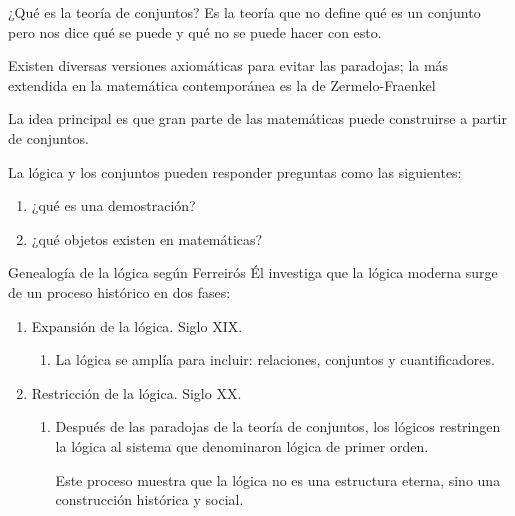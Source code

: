 \documentclass{beamer}
\begin{document}
\begin{frame}{¿Qué es la teoría de conjuntos?}
    Es la teoría que no define qué es un conjunto pero nos dice qué se puede y qué no se puede hacer con esto.

    Existen diversas versiones axiomáticas para evitar las paradojas; la más extendida en la matemática contemporánea es la de Zermelo-Fraenkel
    \vspace{\baselineskip}
    \pause

    La idea principal es que gran parte de las matemáticas puede construirse a partir de conjuntos.
    \vspace{\baselineskip}
    \pause

    La lógica y los conjuntos pueden responder preguntas como las siguientes:
    \begin{enumerate}
        \item ¿qué es una demostración?
        \item ¿qué objetos existen en matemáticas?
    \end{enumerate}
\end{frame}

\begin{frame}{Genealogía de la lógica según Ferreirós}
    Él investiga que la lógica moderna surge de un proceso histórico en dos fases:
    \begin{enumerate}
        \item Expansión de la lógica. Siglo XIX.
        \pause
        \begin{enumerate}
            \item La lógica se amplía para incluir: relaciones, conjuntos y cuantificadores.
        
          \vspace{\baselineskip}
          \pause
        \end{enumerate}
        \item Restricción de la lógica. Siglo XX.
    
          \pause
        \begin{enumerate}
            \item Después de las paradojas de la teoría de conjuntos, los lógicos restringen la lógica al
            sistema que denominaron lógica de primer orden.

            \vspace{\baselineskip}

            Este proceso muestra que la lógica no es una estructura eterna, sino una construcción histórica y social.
        \end{enumerate}
    \end{enumerate}
\end{frame}
\end{document}
